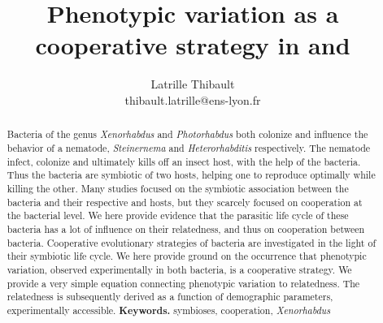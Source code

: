\documentclass[10pt]{article}
\author{Latrille Thibault\\
\small thibault.latrille@ens-lyon.fr\\[-0.8ex]}
\title{Phenotypic variation as a cooperative strategy in \Xeno and \Photo}
\newcommand{\Xeno}{\textit{Xenorhabdus} }
\newcommand{\Stein}{\textit{Steinernema} }
\newcommand{\Photo}{\textit{Photorhabdus} }
\newcommand{\Hetero}{\textit{Heterorhabditis} }
\begin{document}
%
\begin{abstract}
Bacteria of the genus \Xeno and \Photo both colonize and influence the behavior of a nematode, \Stein and \Hetero respectively. The nematode infect, colonize and ultimately kills off an insect host, with the help of the bacteria. Thus the bacteria are symbiotic of two hosts, helping one to reproduce optimally while killing the other. Many studies focused on the symbiotic association between the bacteria and their respective and hosts, but they scarcely focused on cooperation at the bacterial level. We here provide evidence that the parasitic life cycle of these bacteria has a lot of influence on their relatedness, and thus on cooperation between bacteria. 
Cooperative evolutionary strategies of bacteria are investigated in the light of their symbiotic life cycle. We here provide ground on the occurrence that phenotypic variation, observed experimentally in both bacteria, is a cooperative strategy. We provide a very simple equation connecting phenotypic variation to relatedness. The relatedness is subsequently derived as a function of demographic parameters, experimentally accessible.
\smallskip
\noindent \textbf{Keywords.} symbioses, cooperation, \Xeno 
\end{abstract}
\end{document}
